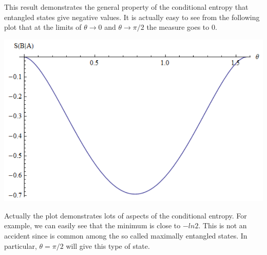 This result demonstrates the general property of the conditional entropy that entangled states give negative values. It is actually easy to see from the following plot that at the limits of $\theta \rightarrow 0$ and $
\theta \rightarrow \pi /2$ the measure goes to 0.
\par
\begin{center}
\includegraphics{figures/cond_ent_plot.png}
\end{center}

Actually the plot demonstrates lots of aspects of the conditional entropy. For example, we can easily see that the minimum is close to $-ln2$. This is not an accident since is common among the so called maximally entangled states. In particular, $\theta= \pi /2$ will give this type of state.